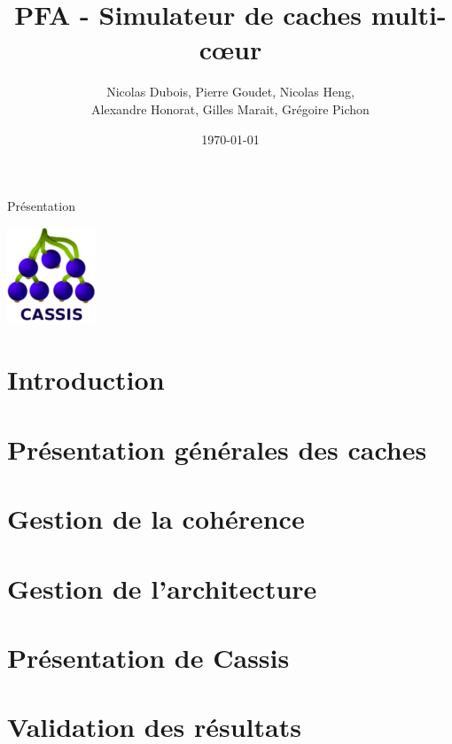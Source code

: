 \documentclass{beamer}
\title[PFA - Simulateur de caches multi-c\oe ur]{PFA - Simulateur de caches multi-c\oe ur}
\author[]{Nicolas Dubois, Pierre Goudet, Nicolas Heng,\\Alexandre Honorat, Gilles Marait, Grégoire Pichon}
\institute[ENSEIRB-MATMECA]{ENSEIRB-MATMECA}
\date{\today}
\begin{document}
\setlength{\unitlength}{1cm}

\begin{frame}{Présentation}

\titlepage

\begin{center}
  \includegraphics[scale=.5]{images/cassis.png}
\end{center} 

\end{frame}



\section*{Introduction}



\section{Présentation générales des caches}


\section{Gestion de la cohérence}


\section{Gestion de l'architecture}


\section{Présentation de Cassis}



\section{Validation des résultats}

\end{document}
